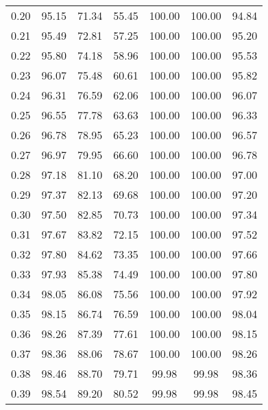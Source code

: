 \begin{tabular}{|c|c|c|c|c|c|c|}
      0.20 &     95.15 &     71.34 &      55.45 &  100.00 &     100.00 &         94.84 \\
      0.21 &     95.49 &     72.81 &      57.25 &  100.00 &     100.00 &         95.20 \\
      0.22 &     95.80 &     74.18 &      58.96 &  100.00 &     100.00 &         95.53 \\
      0.23 &     96.07 &     75.48 &      60.61 &  100.00 &     100.00 &         95.82 \\
      0.24 &     96.31 &     76.59 &      62.06 &  100.00 &     100.00 &         96.07 \\
      0.25 &     96.55 &     77.78 &      63.63 &  100.00 &     100.00 &         96.33 \\
      0.26 &     96.78 &     78.95 &      65.23 &  100.00 &     100.00 &         96.57 \\
      0.27 &     96.97 &     79.95 &      66.60 &  100.00 &     100.00 &         96.78 \\
      0.28 &     97.18 &     81.10 &      68.20 &  100.00 &     100.00 &         97.00 \\
      0.29 &     97.37 &     82.13 &      69.68 &  100.00 &     100.00 &         97.20 \\
      0.30 &     97.50 &     82.85 &      70.73 &  100.00 &     100.00 &         97.34 \\
      0.31 &     97.67 &     83.82 &      72.15 &  100.00 &     100.00 &         97.52 \\
      0.32 &     97.80 &     84.62 &      73.35 &  100.00 &     100.00 &         97.66 \\
      0.33 &     97.93 &     85.38 &      74.49 &  100.00 &     100.00 &         97.80 \\
      0.34 &     98.05 &     86.08 &      75.56 &  100.00 &     100.00 &         97.92 \\
      0.35 &     98.15 &     86.74 &      76.59 &  100.00 &     100.00 &         98.04 \\
      0.36 &     98.26 &     87.39 &      77.61 &  100.00 &     100.00 &         98.15 \\
      0.37 &     98.36 &     88.06 &      78.67 &  100.00 &     100.00 &         98.26 \\
      0.38 &     98.46 &     88.70 &      79.71 &   99.98 &      99.98 &         98.36 \\
      0.39 &     98.54 &     89.20 &      80.52 &   99.98 &      99.98 &         98.45 \\

\end{tabular}
